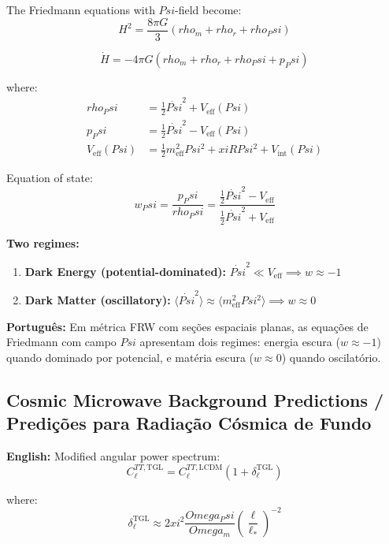 \documentclass[12pt,a4paper]{article}
\def\Psi{Psi}%
\def\xi{xi}%
\def\rho{rho}%
\def\Omega{Omega}%
\begin{document}
The Friedmann equations with $\Psi$-field become:
\begin{equation}
H^2 = \frac{8\pi G}{3}(\rho_m + \rho_r + \rho_\Psi)
\end{equation}

\begin{equation}
\dot{H} = -4\pi G(\rho_m + \rho_r + \rho_\Psi + p_\Psi)
\end{equation}

where:
\begin{align}
\rho_\Psi &= \frac{1}{2}\dot{\Psi}^2 + V_{\text{eff}}(\Psi)\\
p_\Psi &= \frac{1}{2}\dot{\Psi}^2 - V_{\text{eff}}(\Psi)\\
V_{\text{eff}}(\Psi) &= \frac{1}{2}m_{\text{eff}}^2\Psi^2 + \xi R\Psi^2 + V_{\text{int}}(\Psi)
\end{align}

Equation of state:
\begin{equation}
w_\Psi = \frac{p_\Psi}{\rho_\Psi} = \frac{\frac{1}{2}\dot{\Psi}^2 - V_{\text{eff}}}{\frac{1}{2}\dot{\Psi}^2 + V_{\text{eff}}}
\end{equation}

\textbf{Two regimes:}
\begin{enumerate}
    \item \textbf{Dark Energy (potential-dominated):} $\dot{\Psi}^2 \ll V_{\text{eff}} \implies w \approx -1$
    \item \textbf{Dark Matter (oscillatory):} $\langle\dot{\Psi}^2\rangle \approx \langle m_{\text{eff}}^2\Psi^2\rangle \implies w \approx 0$
\end{enumerate}

\textbf{Português:} Em métrica FRW com seções espaciais planas, as equações de Friedmann com campo $\Psi$ apresentam dois regimes: energia escura ($w \approx -1$) quando dominado por potencial, e matéria escura ($w \approx 0$) quando oscilatório.

\subsection{Cosmic Microwave Background Predictions / Predições para Radiação Cósmica de Fundo}

\textbf{English:} Modified angular power spectrum:
\begin{equation}
C_\ell^{TT,\text{TGL}} = C_\ell^{TT,\text{LCDM}}(1 + \delta_\ell^{\text{TGL}})
\end{equation}

where:
\begin{equation}
\delta_\ell^{\text{TGL}} \approx 2\xi^2\frac{\Omega_\Psi}{\Omega_m}\left(\frac{\ell}{\ell_*}\right)^{-2}
\end{equation}
\end{document}
